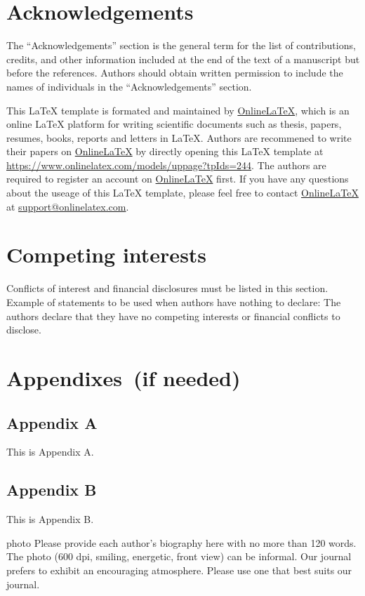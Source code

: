 \documentclass[review]{fcs}
\begin{document}
\fontsize{8.5pt}{10pt}\selectfont

\section*{Acknowledgements}
The ``Acknowledgements'' section is the general term for the list of contributions, credits, and other information included at the end of the text of a manuscript but before the references. Authors should obtain written permission to include the names of individuals in the ``Acknowledgements'' section.

This LaTeX template is formated and maintained by \href{https://www.onlinelatex.com}{OnlineLaTeX}, which is an online LaTeX platform for writing scientific documents such as thesis, papers, resumes, books, reports and letters in LaTeX. Authors are recommened to write their papers on \href{https://www.onlinelatex.com}{OnlineLaTeX} by directly opening this LaTeX template at \url{https://www.onlinelatex.com/models/uppage?tpIds=244}. The authors are required to register an account on \href{https://www.onlinelatex.com}{OnlineLaTeX} first. If you have any questions about the useage of this LaTeX template, please feel free to contact \href{https://www.onlinelatex.com}{OnlineLaTeX} at \url{support@onlinelatex.com}.

\section*{Competing interests}
Conflicts of interest and financial disclosures must be listed in this section. Example of statements to be used when authors have nothing to declare: The authors declare that they have no competing interests or financial conflicts to disclose.

\section*{Appendixes~(if needed)}

\subsection*{Appendix A}

This is Appendix A.

\subsection*{Appendix B}

This is Appendix B.




\begin{biography}{photo}
Please provide each author's biography here with no more than 120 words. The photo (600 dpi, smiling, energetic, front view) can be informal. Our journal prefers to exhibit an encouraging atmosphere. Please use one that best suits our journal.
\end{biography}
\end{document}
